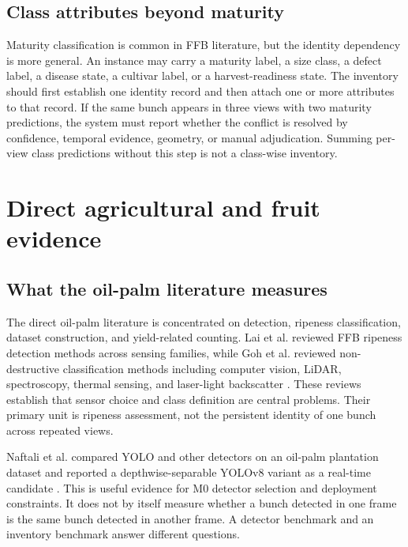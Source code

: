 \subsection{Class attributes beyond maturity}

Maturity classification is common in FFB literature, but the identity dependency is more general. An instance may carry a maturity label, a size class, a defect label, a disease state, a cultivar label, or a harvest-readiness state. The inventory should first establish one identity record and then attach one or more attributes to that record. If the same bunch appears in three views with two maturity predictions, the system must report whether the conflict is resolved by confidence, temporal evidence, geometry, or manual adjudication. Summing per-view class predictions without this step is not a class-wise inventory.

\section{Direct agricultural and fruit evidence}
\label{sec:direct2}

\subsection{What the oil-palm literature measures}

The direct oil-palm literature is concentrated on detection, ripeness classification, dataset construction, and yield-related counting. Lai et al. reviewed FFB ripeness detection methods across sensing families, while Goh et al. reviewed non-destructive classification methods including computer vision, LiDAR, spectroscopy, thermal sensing, and laser-light backscatter \cite{lai2023palmslr,goh2025palmreview}. These reviews establish that sensor choice and class definition are central problems. Their primary unit is ripeness assessment, not the persistent identity of one bunch across repeated views.

Naftali et al. compared YOLO and other detectors on an oil-palm plantation dataset and reported a depthwise-separable YOLOv8 variant as a real-time candidate \cite{naftali2024palmcounter}. This is useful evidence for M0 detector selection and deployment constraints. It does not by itself measure whether a bunch detected in one frame is the same bunch detected in another frame. A detector benchmark and an inventory benchmark answer different questions.

